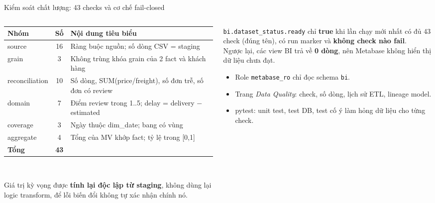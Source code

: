 \documentclass[aspectratio=169,10pt,xcolor=table]{beamer}
\begin{document}
\begin{frame}{Kiểm soát chất lượng: 43 checks và cơ chế fail-closed}
  \begin{columns}[T]
    \begin{column}{0.53\textwidth}
      \footnotesize
      \begin{tabular}{@{}lc P{4.2cm}@{}}
        \toprule
        Nhóm & Số & Nội dung tiêu biểu\\
        \midrule
        source & 16 & Ràng buộc nguồn; số dòng CSV = staging\\
        grain & 3 & Không trùng khóa grain của 2 fact và khách hàng\\
        reconciliation & 10 & Số dòng, SUM(price/freight), số đơn trễ, số đơn có review\\
        domain & 7 & Điểm review trong 1..5; delay = delivery $-$ estimated\\
        coverage & 3 & Ngày thuộc dim\_date; bang có vùng\\
        aggregate & 4 & Tổng của MV khớp fact; tỷ lệ trong [0,1]\\
        \midrule
        \textbf{Tổng} & \textbf{43} & \\
        \bottomrule
      \end{tabular}\\[0.1cm]
      {\scriptsize Giá trị kỳ vọng được \textbf{tính lại độc lập từ staging}, không dùng lại logic transform, để lỗi biến đổi không tự xác nhận chính nó.\par}
    \end{column}
    \begin{column}{0.44\textwidth}
      \begin{keybox}[title={Fail-closed cho lớp BI},coltitle=white,colbacktitle=bkblue,fonttitle=\small\bfseries]
        \texttt{bi.dataset\_status.ready} chỉ \textbf{true} khi lần chạy mới nhất có đủ 43 check (đúng tên), có run marker và \textbf{không check nào fail}.\\[0.1cm]
        Ngược lại, các view BI trả về \textbf{0 dòng}, nên Metabase không hiển thị dữ liệu chưa đạt.
      \end{keybox}
      \footnotesize
      \begin{itemize}
        \item Role \texttt{metabase\_ro} chỉ đọc schema \texttt{bi}.
        \item Trang \emph{Data Quality}: check, số dòng, lịch sử ETL, lineage model.
        \item pytest: unit test, test DB, test cố ý làm hỏng dữ liệu cho từng check.
      \end{itemize}
    \end{column}
  \end{columns}
\end{frame}
\end{document}

